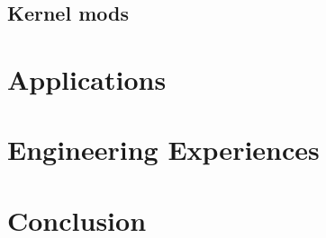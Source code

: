 \documentclass{sig-alternate-10pt}
\begin{document}
\subsection{Kernel mods}
\lipsum[1-3]


\section{Applications}
\label{sec:apps}
\lipsum[1-3]


\section{Engineering Experiences}
\label{sec:eng_exp}
\lipsum[1-3]


\section{Conclusion}
\label{sec:conclusion}
\lipsum[1]

\nocite{*}
{
	
	
}
\end{document}
